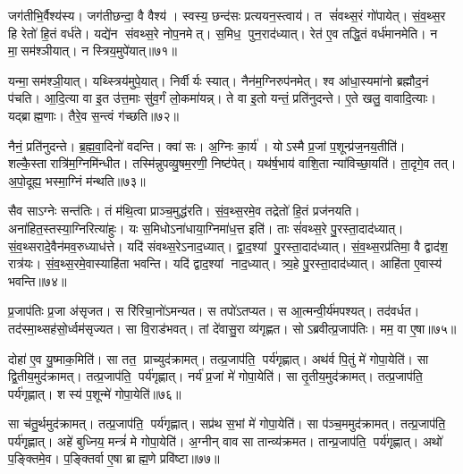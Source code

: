 जग॑तीभि॒र्वैश्य॑स्य। जग॑तीछन्दा॒ वै वैश्य॑। स्वस्य॒ छन्द॑सः प्रत्ययन॒स्त्वाय॑। त सं॑वथ्स॒रं गो॑पायेत्। सं॒व॒थ्स॒र हि रेतो॑ हि॒तं वर्ध॑ते। यद्ये॑न संवथ्स॒रे नोप॒नमेत्। स॒मिध॒ पुन॒राद॑ध्यात्। रेत॑ ए॒व तद्धि॒तं वर्ध॑मानमेति। न मा॒सम॑श्ञीयात्। न स्त्रिय॒मुपे॑यात्॥७१॥

यन्मा॒सम॑श्ञी॒यात्। यथ्स्त्रिय॑मुपे॒यात्। निर्वीर्यः स्यात्। नैन॑म॒ग्निरुप॑नमेत्। श्व आ॑धा॒स्यमा॑नो ब्रह्मौद॒नं प॑चति। आ॒दि॒त्या वा इ॒त उ॑त्त॒माः सु॑व॒र्गं लो॒कमा॑यन्न्। ते वा इ॒तो यन्तं॒ प्रति॑नुदन्ते। ए॒ते खलु॒ वावादि॒त्याः। यद्ब्राह्म॒णाः। तैरे॒व स॒न्त्वं ग॑च्छति॥७२॥

नैनं॒ प्रति॑नुदन्ते। ब्र॒ह्म॒वा॒दिनो॑ वदन्ति। क्वा॑ सः। अ॒ग्निः का॒र्य॑। योऽस्मै प्र॒जां प॒शून्प्र॑ज॒नय॒तीति॑। शल्कै॒स्तारात्रि॑म॒ग्निमि॑न्धीत। तस्मि॑न्नुपव्यु॒षम॒रणी॒ निष्ट॑पेत्। यथ॑र्\mbox{}ष॒भाय॑ वाशि॒ता न्या॑विच्छा॒यति॑। ता॒दृगे॒व तत्। अ॒पो॒दूह्य॒ भस्मा॒ग्निं म॑न्थति॥७३॥

सैव साऽग्नेः सन्त॑तिः। तं म॑थि॒त्वा प्राञ्च॒मुद्ध॑रति। सं॒व॒थ्स॒रमे॒व तद्रेतो॑ हि॒तं प्रज॑नयति। अना॑हित॒स्तस्या॒ग्निरित्या॑हुः। यः स॒मिधोऽना॑धाया॒ग्निमा॑ध॒त्त इति॑। ताः सं॑वथ्स॒रे पु॒रस्ता॒दाद॑ध्यात्। सं॒व॒थ्सरादे॒वैन॑मव॒रुध्याध॑त्ते। यदि॑ संवथ्स॒रेऽनाद॒ध्यात्। द्वा॒द॒श्यां पु॒रस्ता॒दाद॑ध्यात्। सं॒व॒थ्स॒रप्र॑तिमा॒ वै द्वाद॑श॒ रात्र॑यः। सं॒व॒थ्स॒रमे॒वास्याहि॑ता भवन्ति। यदि॑ द्वाद॒श्यां नाद॒ध्यात्। त्र्य॒हे पु॒रस्ता॒दाद॑ध्यात्। आहि॑ता ए॒वास्य॑ भवन्ति॥७४॥

प्र॒जाप॑तिः प्र॒जा अ॑सृजत। स रि॑रिचा॒नो॑ऽमन्यत। स तपो॑ऽतप्यत। स आ॒त्मन्वी॒र्य॑मपश्यत्। तद॑वर्धत। तद॑स्मा॒थ्सह॑सो॒र्ध्वम॑सृज्यत। सा वि॒राड॑भवत्। तां दे॑वासु॒रा व्य॑गृह्णत। सोऽब्रवीत्प्र॒जाप॑तिः। मम॒ वा ए॒षा॥७५॥

दोहा॑ ए॒व यु॒ष्माक॒मिति॑। सा तत॒ प्राच्युद॑क्रामत्। तत्प्र॒जाप॑ति॒ पर्य॑गृह्णात्। अथ॑र्व पि॒तुं मे॑ गोपा॒येति॑। सा द्वि॒तीय॒मुद॑क्रामत्। तत्प्र॒जाप॑ति॒ पर्य॑गृह्णात्। नर्य॑ प्र॒जां मे॑ गोपा॒येति॑। सा तृ॒तीय॒मुद॑क्रामत्। तत्प्र॒जाप॑ति॒ पर्य॑गृह्णात्। शस्य॑ प॒शून्मे॑ गोपा॒येति॑॥७६॥

सा च॑तु॒र्थमुद॑क्रामत्। तत्प्र॒जाप॑ति॒ पर्य॑गृह्णात्। सप्र॑थ स॒भां मे॑ गोपा॒येति॑। सा प॑ञ्च॒ममुद॑क्रामत्। तत्प्र॒जाप॑ति॒ पर्य॑गृह्णात्। अहे॑ बुध्निय॒ मन्त्रं॑ मे गोपा॒येति॑। अ॒ग्नीन् वाव सा तान्व्य॑क्रमत। तान्प्र॒जाप॑ति॒ पर्य॑गृह्णात्। अथो॑ प॒ङ्क्तिमे॒व। प॒ङ्क्तिर्वा ए॒षा ब्राह्म॒णे प्रवि॑ष्टा॥७७॥


